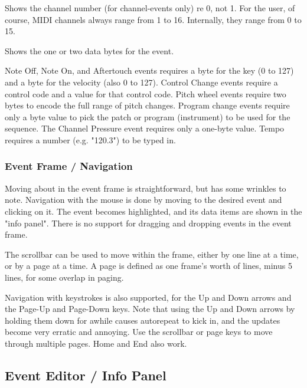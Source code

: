 
   Shows the channel number (for channel-events only) re 0, not 1.
   For the user, of course, MIDI channels always range from
   1 to 16.  Internally, they range from 0 to 15.

   Shows the one or two data bytes for the event.

   Note Off, Note On, and Aftertouch events requires a byte for the key (0 to
   127) and a byte for the velocity (also 0 to 127).
   Control Change events require a control code and a value for that control
   code.  Pitch wheel events require two bytes to encode the full range of
   pitch changes.
   Program change events require only a byte value to pick the patch or program
   (instrument) to be used for the sequence.  The Channel Pressure event
   requires only a one-byte value.
   Tempo requires a number (e.g. "120.3") to be typed in.

\subsubsection{Event Frame / Navigation}
\label{subsec:seq64_event_frame_navigation}

   Moving about in the event frame is straightforward, but has some
   wrinkles to note.
   Navigation with the mouse is done by moving to the desired event and
   clicking on it.  The event becomes highlighted, and its data items are shown
   in the "info panel".
   There is no support for dragging and dropping events in the event frame.

   The scrollbar can be used to move within the frame, either by one line at a
   time, or by a page at a time.  A page is defined as one frame's worth of
   lines, minus 5 lines, for some overlap in paging.

   Navigation with keystrokes is also supported, for the Up and Down arrows and
   the Page-Up and Page-Down keys.  Note that using the Up and Down arrows by
   holding them down for awhile causes autorepeat to kick in, and the updates
   become very erratic and annoying.  Use the scrollbar or page keys to
   move through multiple pages.  Home and End also work.

\subsection{Event Editor / Info Panel}
\label{subsec:seq64_event_editor_info}

